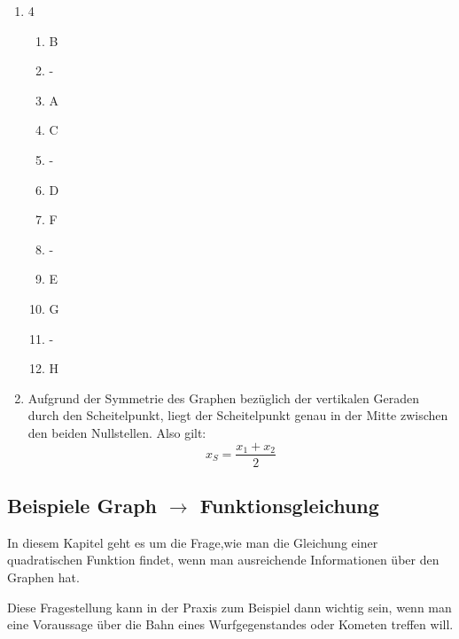 \begin{enumerate}
\begin{minipage}[t]{0.8\textwidth}
          \end{minipage}
    \item \begin{minipage}[t]{\linewidth}
              \vspace{0pt}
              \begin{multicols}{4}
                  \begin{enumerate}[label=(\arabic*)]
                      \item B
                      \item -
                      \item A
                      \item C
                      \item -
                      \item D
                      \item F
                      \item -
                      \item E
                      \item G
                      \item -
                      \item H
                  \end{enumerate}
              \end{multicols}
          \end{minipage}
    \item Aufgrund der Symmetrie des Graphen bezüglich der vertikalen Geraden durch den Scheitelpunkt, liegt der Scheitelpunkt genau in der Mitte zwischen den beiden Nullstellen. Also gilt:
          \[x_S = \frac{x_1 + x_2}{2}\]
\end{enumerate}
\newpage
\subsection{Beispiele Graph $\rightarrow$ Funktionsgleichung}
In diesem Kapitel geht es um die Frage,wie man die Gleichung einer quadratischen Funktion findet, wenn man ausreichende Informationen über den Graphen hat.

Diese Fragestellung kann in der Praxis zum Beispiel dann wichtig sein, wenn man eine Voraussage über die Bahn eines Wurfgegenstandes oder Kometen treffen will.
